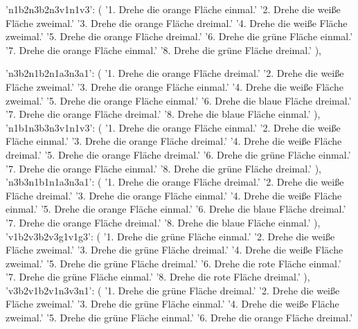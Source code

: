 {{        'n1b2n3b2n3v1n1v3': (
            '1. Drehe die orange Fläche einmal.\n'
            '2. Drehe die weiße Fläche zweimal.\n'
            '3. Drehe die orange Fläche dreimal.\n'
            '4. Drehe die weiße Fläche zweimal.\n'
            '5. Drehe die orange Fläche dreimal.\n'
            '6. Drehe die grüne Fläche einmal.\n'
            '7. Drehe die orange Fläche einmal.\n'
            '8. Drehe die grüne Fläche dreimal.'
        ),

        'n3b2n1b2n1a3n3a1': (
            '1. Drehe die orange Fläche dreimal.\n'
            '2. Drehe die weiße Fläche zweimal.\n'
            '3. Drehe die orange Fläche einmal.\n'
            '4. Drehe die weiße Fläche zweimal.\n'
            '5. Drehe die orange Fläche einmal.\n'
            '6. Drehe die blaue Fläche dreimal.\n'
            '7. Drehe die orange Fläche dreimal.\n'
            '8. Drehe die blaue Fläche einmal.'
        ),
        'n1b1n3b3n3v1n1v3': (
            '1. Drehe die orange Fläche einmal.\n'
            '2. Drehe die weiße Fläche einmal.\n'
            '3. Drehe die orange Fläche dreimal.\n'
            '4. Drehe die weiße Fläche dreimal.\n'
            '5. Drehe die orange Fläche dreimal.\n'
            '6. Drehe die grüne Fläche einmal.\n'
            '7. Drehe die orange Fläche einmal.\n'
            '8. Drehe die grüne Fläche dreimal.'
        ),
        'n3b3n1b1n1a3n3a1': (
            '1. Drehe die orange Fläche dreimal.\n'
            '2. Drehe die weiße Fläche dreimal.\n'
            '3. Drehe die orange Fläche einmal.\n'
            '4. Drehe die weiße Fläche einmal.\n'
            '5. Drehe die orange Fläche einmal.\n'
            '6. Drehe die blaue Fläche dreimal.\n'
            '7. Drehe die orange Fläche dreimal.\n'
            '8. Drehe die blaue Fläche einmal.'
        ),
        'v1b2v3b2v3g1v1g3': (
            '1. Drehe die grüne Fläche einmal.\n'
            '2. Drehe die weiße Fläche zweimal.\n'
            '3. Drehe die grüne Fläche dreimal.\n'
            '4. Drehe die weiße Fläche zweimal.\n'
            '5. Drehe die grüne Fläche dreimal.\n'
            '6. Drehe die rote Fläche einmal.\n'
            '7. Drehe die grüne Fläche einmal.\n'
            '8. Drehe die rote Fläche dreimal.'
        ),
        'v3b2v1b2v1n3v3n1': (
            '1. Drehe die grüne Fläche dreimal.\n'
            '2. Drehe die weiße Fläche zweimal.\n'
            '3. Drehe die grüne Fläche einmal.\n'
            '4. Drehe die weiße Fläche zweimal.\n'
            '5. Drehe die grüne Fläche einmal.\n'
            '6. Drehe die orange Fläche dreimal.\n'
}}
